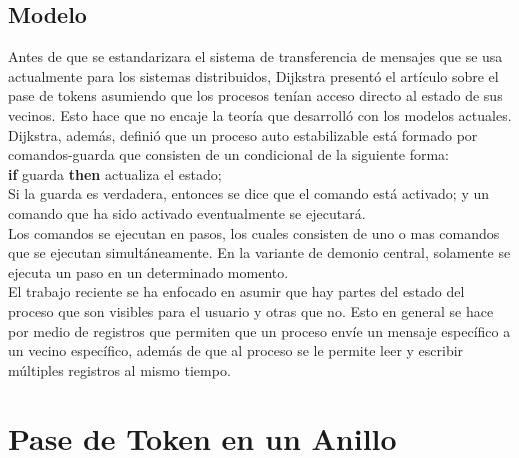 \documentclass[12pt,a4paper]{article}
\begin{document}
{{}
\subsection{Modelo}{
    Antes de que se estandarizara el sistema de transferencia de mensajes que se usa actualmente para los sistemas distribuidos, Dijkstra presentó el artículo sobre el pase de tokens asumiendo que los procesos tenían acceso directo al estado de sus vecinos. Esto hace que no encaje la teoría que desarrolló con los modelos actuales. \\
    Dijkstra, además, definió que un proceso auto estabilizable está formado por comandos-guarda que consisten de un condicional de la siguiente forma:\\
    \indent\indent \textbf{if} guarda \textbf{then} actualiza el estado; \\
    Si la guarda es verdadera, entonces se dice que el comando está activado; y un comando que ha sido activado eventualmente se ejecutará.\\
    Los comandos se ejecutan en pasos, los cuales consisten de uno o mas comandos que se ejecutan simultáneamente. En la variante de demonio central, solamente se ejecuta un paso en un determinado momento.\\
    El trabajo reciente se ha enfocado en asumir que hay partes del estado del proceso que son visibles para el usuario y otras que no. Esto en general se hace por medio de registros que permiten que un proceso envíe un mensaje específico a un vecino específico, además de que al proceso se le permite leer y escribir múltiples registros al mismo tiempo.

}
}
\section{Pase de Token en un Anillo}{}
\end{document}
